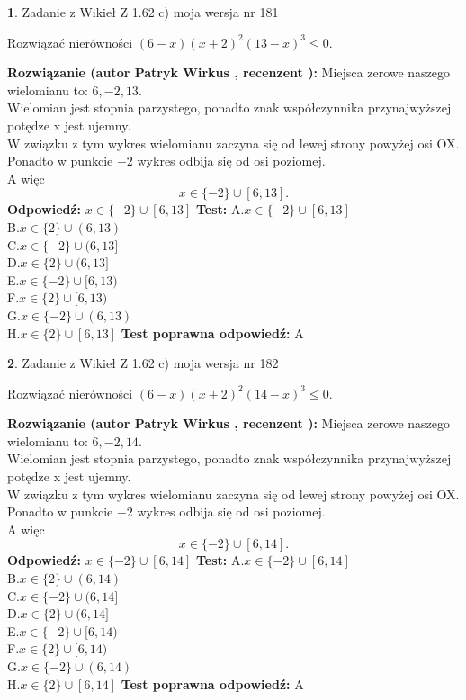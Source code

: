 \documentclass[12pt, a4paper]{article}
\theoremstyle{definition} %
\newtheorem{zad}{}
\newcommand{\zadStart}[1]{\begin{zad}#1\newline}
\newcommand{\zadStop}{\end{zad}}
\newcommand{\rozwStart}[2]{\noindent \textbf{Rozwiązanie (autor #1 , recenzent #2): }\newline}
\newcommand{\rozwStop}{\newline}
\newcommand{\odpStart}{\noindent \textbf{Odpowiedź:}\newline}
\newcommand{\odpStop}{\newline}
\newcommand{\testStart}{\noindent \textbf{Test:}\newline}
\newcommand{\testStop}{\newline}
\newcommand{\kluczStart}{\noindent \textbf{Test poprawna odpowiedź:}\newline}
\newcommand{\kluczStop}{\newline}
\begin{document}
\zadStart{Zadanie z Wikieł Z 1.62 c) moja wersja nr 181}

Rozwiązać nierówności $(6-x)(x+2)^{2}(13-x)^{3}\le0$.
\zadStop
\rozwStart{Patryk Wirkus}{}
Miejsca zerowe naszego wielomianu to: $6, -2, 13$.\\
Wielomian jest stopnia parzystego, ponadto znak współczynnika przy\linebreak najwyższej potędze x jest ujemny.\\ W związku z tym wykres wielomianu zaczyna się od lewej strony powyżej osi OX.\\
Ponadto w punkcie $-2$ wykres odbija się od osi poziomej.\\
A więc $$x \in \{-2\} \cup [6,13].$$
\rozwStop
\odpStart
$x \in \{-2\} \cup [6,13]$
\odpStop
\testStart
A.$x \in \{-2\} \cup [6,13]$\\
B.$x \in \{2\} \cup (6,13)$\\
C.$x \in \{-2\} \cup (6,13]$\\
D.$x \in \{2\} \cup (6,13]$\\
E.$x \in \{-2\} \cup [6,13)$\\
F.$x \in \{2\} \cup [6,13)$\\
G.$x \in \{-2\} \cup (6,13)$\\
H.$x \in \{2\} \cup [6,13]$
\testStop
\kluczStart
A
\kluczStop



\zadStart{Zadanie z Wikieł Z 1.62 c) moja wersja nr 182}

Rozwiązać nierówności $(6-x)(x+2)^{2}(14-x)^{3}\le0$.
\zadStop
\rozwStart{Patryk Wirkus}{}
Miejsca zerowe naszego wielomianu to: $6, -2, 14$.\\
Wielomian jest stopnia parzystego, ponadto znak współczynnika przy\linebreak najwyższej potędze x jest ujemny.\\ W związku z tym wykres wielomianu zaczyna się od lewej strony powyżej osi OX.\\
Ponadto w punkcie $-2$ wykres odbija się od osi poziomej.\\
A więc $$x \in \{-2\} \cup [6,14].$$
\rozwStop
\odpStart
$x \in \{-2\} \cup [6,14]$
\odpStop
\testStart
A.$x \in \{-2\} \cup [6,14]$\\
B.$x \in \{2\} \cup (6,14)$\\
C.$x \in \{-2\} \cup (6,14]$\\
D.$x \in \{2\} \cup (6,14]$\\
E.$x \in \{-2\} \cup [6,14)$\\
F.$x \in \{2\} \cup [6,14)$\\
G.$x \in \{-2\} \cup (6,14)$\\
H.$x \in \{2\} \cup [6,14]$
\testStop
\kluczStart
A
\kluczStop
\end{document}
